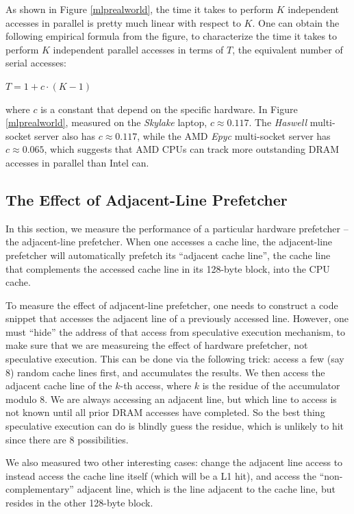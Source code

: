 \documentclass[11pt, usletter]{article}
\begin{document}
As shown in Figure \ref{mlprealworld}, the time it takes to perform $K$ independent accesses in parallel 
is pretty much linear with respect to $K$. 
One can obtain the following empirical formula from the figure, to characterize the 
time it takes to perform $K$ independent parallel accesses in terms of $T$, the equivalent number of serial accesses:
\begin{center}
$T=1+c\cdot (K-1)$
\end{center}
where $c$ is a constant that depend on the specific hardware. 
In Figure \ref{mlprealworld}, measured on the \textit{Skylake} laptop, $c\approx 0.117$. 
The \textit{Haswell} multi-socket server also has $c\approx 0.117$, 
while the AMD \textit{Epyc} multi-socket server has $c\approx 0.065$,
which suggests that AMD CPUs can track more outstanding DRAM accesses in parallel than Intel can. 

\subsection{The Effect of Adjacent-Line Prefetcher} \label{adjlineprefetcher}

In this section, we measure the performance of a particular hardware prefetcher -- the adjacent-line prefetcher. 
When one accesses a cache line, the adjacent-line prefetcher will automatically prefetch 
its ``adjacent cache line'', the cache line that complements the accessed cache line in its 128-byte block, 
into the CPU cache. 

To measure the effect of adjacent-line prefetcher, one needs to construct a code snippet 
that accesses the adjacent line of a previously accessed line. 
However, one must ``hide'' the address of that access from speculative execution mechanism, 
to make sure that we are measureing the effect of hardware prefetcher, not speculative execution. 
This can be done via the following trick: 
access a few (say 8) random cache lines first, and accumulates the results. 
We then access the adjacent cache line of the $k$-th access, where $k$ is the residue of the accumulator modulo 8. 
We are always accessing an adjacent line, 
but which line to access is not known until all prior DRAM accesses have completed.
So the best thing speculative execution can do is blindly guess the residue, 
which is unlikely to hit since there are 8 possibilities. 

We also measured two other interesting cases: 
change the adjacent line access to instead access the cache line itself (which will be a L1 hit), 
and access the ``non-complementary'' adjacent line, which is the line adjacent to the cache line, 
but resides in the other 128-byte block.
\end{document}
